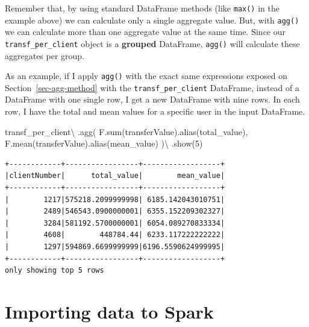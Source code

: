 \documentclass[
  11pt,
  letterpaper,
  DIV=11,
  numbers=noendperiod]{scrreprt}
\newenvironment{Shaded}{\begin{snugshade}}{\end{snugshade}}
\newcommand{\BuiltInTok}[1]{\textcolor[rgb]{0.00,0.23,0.31}{#1}}
\newcommand{\DecValTok}[1]{\textcolor[rgb]{0.68,0.00,0.00}{#1}}
\newcommand{\NormalTok}[1]{\textcolor[rgb]{0.00,0.23,0.31}{#1}}
\newcommand{\OperatorTok}[1]{\textcolor[rgb]{0.37,0.37,0.37}{#1}}
\newcommand{\StringTok}[1]{\textcolor[rgb]{0.13,0.47,0.30}{#1}}
\begin{document}
Remember that, by using standard DataFrame methods (like \texttt{max()}
in the example above) we can calculate only a single aggregate value.
But, with \texttt{agg()} we can calculate more than one aggregate value
at the same time. Since our \texttt{transf\_per\_client} object is a
\textbf{grouped} DataFrame, \texttt{agg()} will calculate these
aggregates per group.

As an example, if I apply \texttt{agg()} with the exact same expressions
exposed on Section~\ref{sec-agg-method} with the
\texttt{transf\_per\_client} DataFrame, instead of a DataFrame with one
single row, I get a new DataFrame with nine rows. In each row, I have
the total and mean values for a specific user in the input DataFrame.

\begin{Shaded}
\begin{Highlighting}[]
\NormalTok{transf\_per\_client}\OperatorTok{\textbackslash{}}
\NormalTok{  .agg(}
\NormalTok{    F.}\BuiltInTok{sum}\NormalTok{(}\StringTok{\textquotesingle{}transferValue\textquotesingle{}}\NormalTok{).alias(}\StringTok{\textquotesingle{}total\_value\textquotesingle{}}\NormalTok{),}
\NormalTok{    F.mean(}\StringTok{\textquotesingle{}transferValue\textquotesingle{}}\NormalTok{).alias(}\StringTok{\textquotesingle{}mean\_value\textquotesingle{}}\NormalTok{)}
\NormalTok{  )}\OperatorTok{\textbackslash{}}
\NormalTok{  .show(}\DecValTok{5}\NormalTok{)}
\end{Highlighting}
\end{Shaded}

\begin{verbatim}
+------------+-----------------+------------------+
|clientNumber|      total_value|        mean_value|
+------------+-----------------+------------------+
|        1217|575218.2099999998| 6185.142043010751|
|        2489|546543.0900000001| 6355.152209302327|
|        3284|581192.5700000001| 6054.089270833334|
|        4608|        448784.44| 6233.117222222222|
|        1297|594869.6699999999|6196.5590624999995|
+------------+-----------------+------------------+
only showing top 5 rows
\end{verbatim}


\hypertarget{sec-import-export}{%
\chapter{Importing data to Spark}\label{sec-import-export}}
\end{document}
